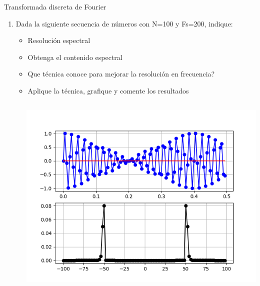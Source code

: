  \begin{frame}{Transformada discreta de Fourier}
    \begin{enumerate}
       \item{Dada la siguiente secuencia de números con N=100 y Fs=200, indique:}
    \begin{itemize}
       \item{Resolución espectral}
       \item{Obtenga el contenido espectral}
       \item{Que técnica conoce para mejorar la resolución en frecuencia?}
       \item{Aplique la técnica, grafique y comente los resultados}
    \end{itemize}

   \begin{columns}[c]
      \hspace{2pt}
      \begin{column}{.6\textwidth}
         
      \end{column}
      \hspace{2pt}
      \vrule
      \begin{column}{.4\textwidth}
         \centering\includegraphics[width=1.0\textwidth]{tp2/zero_padding}
      \end{column}
      \hspace{2pt}
   \end{columns}
    \end{enumerate}
 \end{frame}
